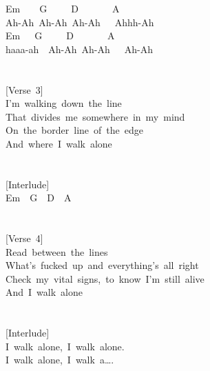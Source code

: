 \documentclass[]{book}
\begin{document}
\hspace*{0.333em}Em~~~~G~~~~~D~~~~~~~A\\
Ah-Ah~Ah-Ah~Ah-Ah~~~Ahhh-Ah\\
\hspace*{0.333em}\hspace*{0.333em}\hspace*{0.333em}\hspace*{0.333em}\hspace*{0.333em}Em~~~G~~~~~D~~~~~~~A\\
haaa-ah~~Ah-Ah~Ah-Ah~~~Ah-Ah\\
~\\
~\\
{[}Verse~3{]}\\
I'm~walking~down~the~line\\
That~divides~me~somewhere~in~my~mind\\
On~the~border~line~of~the~edge\\
And~where~I~walk~alone\\
~\\
~\\
{[}Interlude{]}\\
Em~~G~~D~~A\\
~\\
~\\
{[}Verse~4{]}\\
Read~between~the~lines\\
What's~fucked~up~and~everything's~all~right\\
Check~my~vital~signs,~to~know~I'm~still~alive\\
And~I~walk~alone\\
~\\
~\\
{[}Interlude{]}\\
\hspace*{0.333em}\hspace*{0.333em}\hspace*{0.333em}\hspace*{0.333em}\hspace*{0.333em}\hspace*{0.333em}\hspace*{0.333em}\hspace*{0.333em}\hspace*{0.333em}\hspace*{0.333em}\hspace*{0.333em}\hspace*{0.333em}I~walk~alone,~I~walk~alone.\\
\hspace*{0.333em}\hspace*{0.333em}\hspace*{0.333em}\hspace*{0.333em}\hspace*{0.333em}\hspace*{0.333em}\hspace*{0.333em}\hspace*{0.333em}\hspace*{0.333em}\hspace*{0.333em}\hspace*{0.333em}\hspace*{0.333em}I~walk~alone,~I~walk~a\ldots.\\
\end{document}
